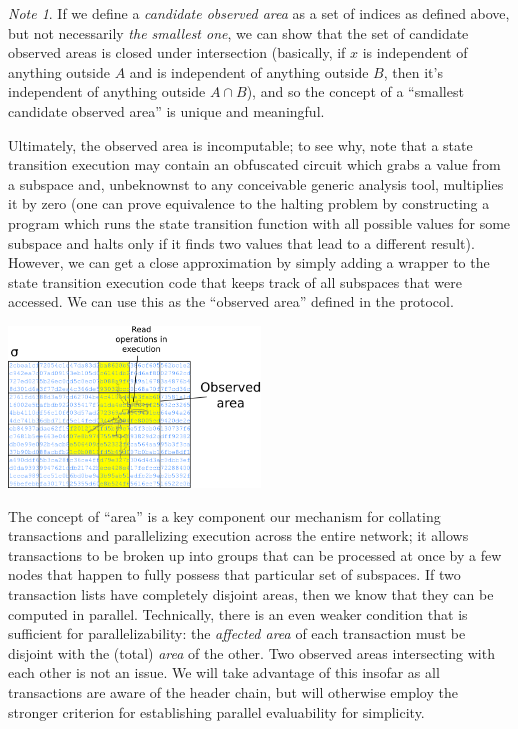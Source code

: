 \documentclass[11pt,a4paper]{article}
\theoremstyle{plain}
\theoremstyle{definition}
\theoremstyle{remark}
\newtheorem*{note}{Note}
\begin{document}
\begin{note}
If we define a \emph{candidate observed area} as a set of indices as defined above, but not necessarily \emph{the smallest one}, we can show that the set of candidate observed areas is closed under intersection (basically, if $x$ is independent of anything outside $A$ and is independent of anything outside $B$, then it's independent of anything outside $A \cap B$), and so the concept of a ``smallest candidate observed area'' is unique and meaningful.

Ultimately, the observed area is incomputable; to see why, note that a state transition execution may contain an obfuscated circuit which grabs a value from a subspace and, unbeknownst to any conceivable generic analysis tool, multiplies it by zero (one can prove equivalence to the halting problem by constructing a program which runs the state transition function with all possible values for some subspace and halts only if it finds two values that lead to a different result). However, we can get a close approximation by simply adding a wrapper to the state transition execution code that keeps track of all subspaces that were accessed. We can use this as the ``observed area'' defined in the protocol.
\end{note}

\begin{center}
\includegraphics[width=190pt]{subspace3.png}
\end{center}

The concept of ``area'' is a key component our mechanism for collating transactions and parallelizing execution across the entire network; it allows transactions to be broken up into groups that can be processed at once by a few nodes that happen to fully possess that particular set of subspaces. If two transaction lists have completely disjoint areas, then we know that they can be computed in parallel. Technically, there is an even weaker condition that is sufficient for parallelizability: the \emph{affected area} of each transaction must be disjoint with the (total) \emph{area} of the other. Two observed areas intersecting with each other is not an issue. We will take advantage of this insofar as all transactions are aware of the header chain, but will otherwise employ the stronger criterion for establishing parallel evaluability for simplicity.
\end{document}
